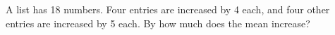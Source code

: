 A list has 18 numbers. Four entries are increased by 4 each, and four other entries are increased by 5 each. By how much does the mean increase?
